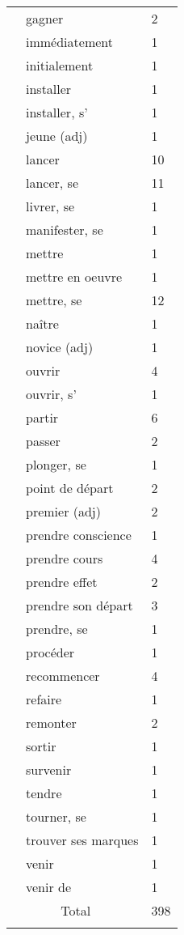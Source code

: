 \begin{tabularx}{\textwidth}{XXX}
& gagner &  2\\
& immédiatement &  1\\
& initialement &  1\\
& installer &  1\\
& installer, s' &  1\\
& jeune (adj) &  1\\
& lancer &  10\\
& lancer, se &  11\\
& livrer, se &  1\\
& manifester, se &  1\\
& mettre &  1\\
& mettre en oeuvre &  1\\
& mettre, se &  12\\
& naître &  1\\
& novice (adj) &  1\\
& ouvrir &  4\\
& ouvrir, s' &  1\\
& partir &  6\\
& passer &  2\\
& plonger, se &  1\\
& point de départ &  2\\
& premier (adj) &  2\\
& prendre conscience &  1\\
& prendre cours &  4\\
& prendre effet &  2\\
& prendre son départ &  3\\
& prendre, se &  1\\
& procéder &  1\\
& recommencer &  4\\
& refaire &  1\\
& remonter &  2\\
& sortir &  1\\
& survenir &  1\\
& tendre &  1\\
& tourner, se &  1\\
& trouver ses marques &  1\\
& venir &  1\\
& venir de &  1\\
\multicolumn{2}{c}{Total} &  398\\
\lspbottomrule
\end{tabularx}

\newpage
